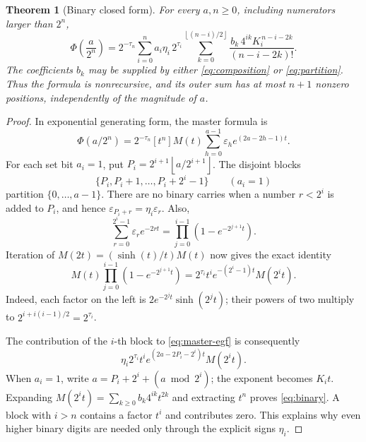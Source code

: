 \documentclass[11pt,a4paper]{article}
\newtheorem{theorem}{Theorem}[section]
\theoremstyle{definition}
\theoremstyle{remark}
\newcommand{\eps}{\varepsilon}
\newcommand{\coeff}[2]{[#1^{#2}]}
\newcommand{\floor}[1]{\left\lfloor #1\right\rfloor}
\begin{document}
\begin{theorem}[Binary closed form]
For every \(a,n\geq0\), including numerators larger than \(2^n\),
\begin{equation}
 \boxed{\displaystyle
 \Phi\!\left(\frac a{2^n}\right)
 =2^{-\tau_n}\sum_{i=0}^{n}a_i\eta_i\,2^{\tau_i}
   \sum_{k=0}^{\floor{(n-i)/2}}
      \frac{b_k\,4^{ik}K_i^{\,n-i-2k}}{(n-i-2k)!}.}
                                                               \label{eq:binary}
\end{equation}
The coefficients \(b_k\) may be supplied by either \eqref{eq:composition} or
\eqref{eq:partition}.  Thus the formula is nonrecursive, and its outer sum has at
most \(n+1\) nonzero positions, independently of the magnitude of \(a\).
\end{theorem}
\begin{proof}
In exponential generating form, the master formula is
\begin{equation}
 \Phi(a/2^n)=2^{-\tau_n}\coeff{t}{n}
       M(t)\sum_{h=0}^{a-1}\eps_h e^{(2a-2h-1)t}.        \label{eq:master-egf}
\end{equation}
For each set bit \(a_i=1\), put
\(P_i=2^{i+1}\floor{a/2^{i+1}}\).  The disjoint blocks
\[
 \{P_i,P_i+1,\ldots,P_i+2^i-1\}\qquad(a_i=1)
\]
partition \(\{0,\ldots,a-1\}\).  There are no binary carries when a number
\(r<2^i\) is added to \(P_i\), and hence
\(\eps_{P_i+r}=\eta_i\eps_r\).  Also,
\begin{equation}
 \sum_{r=0}^{2^i-1}\eps_r e^{-2rt}
       =\prod_{j=0}^{i-1}(1-e^{-2^{j+1}t}).              \label{eq:TM-product}
\end{equation}
Iteration of \(M(2t)=(\sinh(t)/t)M(t)\) now gives the exact identity
\begin{equation}
 M(t)\prod_{j=0}^{i-1}(1-e^{-2^{j+1}t})
  =2^{\tau_i}t^i e^{-(2^i-1)t}M(2^i t).                \label{eq:block-M}
\end{equation}
Indeed, each factor on the left is
\(2e^{-2^jt}\sinh(2^jt)\); their powers of two multiply to
\(2^{i+i(i-1)/2}=2^{\tau_i}\).

The contribution of the \(i\)-th block to \eqref{eq:master-egf} is consequently
\[
 \eta_i2^{\tau_i}t^i
     e^{(2a-2P_i-2^i)t}M(2^it).
\]
When \(a_i=1\), write \(a=P_i+2^i+(a\bmod2^i)\); the exponent becomes
\(K_it\).  Expanding \(M(2^it)=\sum_{k\geq0}b_k4^{ik}t^{2k}\)
and extracting \(t^n\) proves \eqref{eq:binary}.  A block with \(i>n\) contains
a factor \(t^i\) and contributes zero.  This explains why even higher binary digits
are needed only through the explicit signs \(\eta_i\).
\end{proof}
\end{document}
